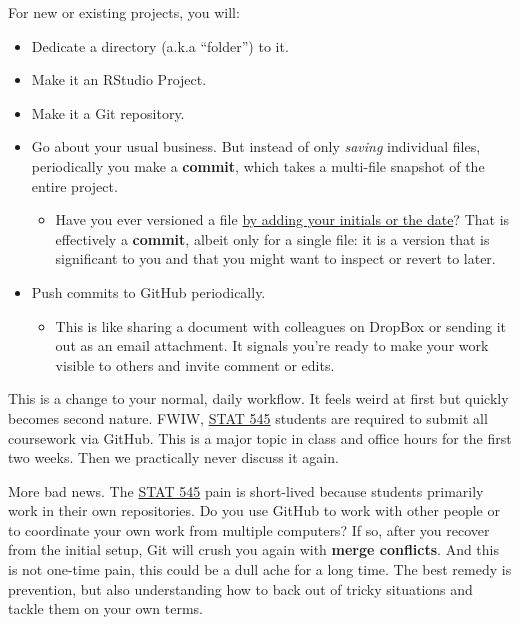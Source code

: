 \documentclass[
]{book}
\providecommand{\tightlist}{%
  \setlength{\itemsep}{0pt}\setlength{\parskip}{0pt}}
\begin{document}
For new or existing projects, you will:

\begin{itemize}
\tightlist
\item
  Dedicate a directory (a.k.a ``folder'') to it.
\item
  Make it an RStudio Project.
\item
  Make it a Git repository.
\item
  Go about your usual business. But instead of only \emph{saving} individual files, periodically you make a \textbf{commit}, which takes a multi-file snapshot of the entire project.

  \begin{itemize}
  \tightlist
  \item
    Have you ever versioned a file \href{http://www.phdcomics.com/comics/archive.php?comicid=1531}{by adding your initials or the date}? That is effectively a \textbf{commit}, albeit only for a single file: it is a version that is significant to you and that you might want to inspect or revert to later.
  \end{itemize}
\item
  Push commits to GitHub periodically.

  \begin{itemize}
  \tightlist
  \item
    This is like sharing a document with colleagues on DropBox or sending it out as an email attachment. It signals you're ready to make your work visible to others and invite comment or edits.
  \end{itemize}
\end{itemize}

This is a change to your normal, daily workflow. It feels weird at first but quickly becomes second nature. FWIW, \href{http://stat545.com}{STAT 545} students are required to submit all coursework via GitHub. This is a major topic in class and office hours for the first two weeks. Then we practically never discuss it again.

More bad news. The \href{http://stat545.com}{STAT 545} pain is short-lived because students primarily work in their own repositories. Do you use GitHub to work with other people or to coordinate your own work from multiple computers? If so, after you recover from the initial setup, Git will crush you again with \textbf{merge conflicts}. And this is not one-time pain, this could be a dull ache for a long time. The best remedy is prevention, but also understanding how to back out of tricky situations and tackle them on your own terms.
\end{document}
